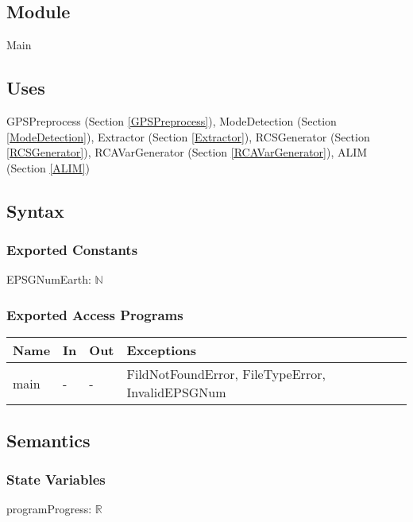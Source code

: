 \documentclass[12pt, titlepage]{article}
\begin{document}


\subsection{Module}
Main

\subsection{Uses}
GPSPreprocess (Section \ref{GPSPreprocess}),
ModeDetection (Section \ref{ModeDetection}), 
Extractor (Section \ref{Extractor}), 
RCSGenerator (Section \ref{RCSGenerator}), 
RCAVarGenerator (Section \ref{RCAVarGenerator}), 
ALIM (Section \ref{ALIM})

\subsection{Syntax}

\subsubsection{Exported Constants}
EPSGNumEarth: $\mathbb{N}$
\subsubsection{Exported Access Programs}

\begin{center}
\begin{tabular}{| l | l | l | l |}%
\hline
\textbf{Name} & \textbf{In} & \textbf{Out} & \textbf{Exceptions} \\
\hline
main & - & - & FildNotFoundError, FileTypeError, InvalidEPSGNum\\
\hline
\end{tabular}
\end{center}

\subsection{Semantics}

\subsubsection{State Variables}
programProgress: $\mathbb{R}$
\end{document}
